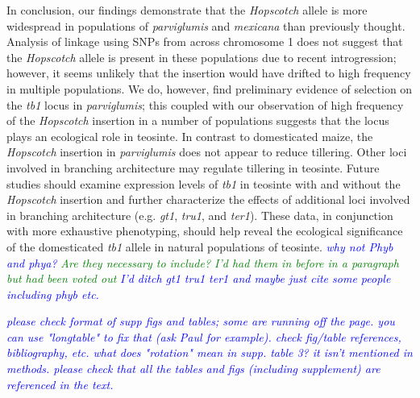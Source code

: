 \documentclass[11pt]{article}
\newcommand{\jri}[1]{\textcolor{blue}{ \emph{\scriptsize  #1}} }
\newcommand{\mbh}[1]{\textcolor{red}{ \emph{\scriptsize  #1}} }
\newcommand{\lev}[1]{\textcolor{green}{\emph{\scriptsize #1}} }
\begin{document}
\begin{linenumbers}
\begin{flushleft}
In conclusion, our findings demonstrate that the \emph{Hopscotch} allele is more widespread in populations of \emph{parviglumis} and \emph{mexicana} than previously thought. Analysis of linkage using SNPs from across chromosome 1 does not suggest that the \emph{Hopscotch} allele is present in these populations due to recent introgression; however, it seems unlikely that the insertion would have drifted to high frequency in multiple populations. We do, however, find preliminary evidence of selection on the \emph{tb1} locus in \emph{parviglumis}; this coupled with our observation of high frequency of the \emph{Hopscotch} insertion in a number of populations suggests that the locus plays an ecological role in teosinte. In contrast to domesticated maize, the \emph{Hopscotch} insertion in \emph{parviglumis} does not appear to reduce tillering. Other loci involved in branching architecture may regulate tillering in teosinte. Future studies should examine expression levels of \emph{tb1} in teosinte with and without the \emph{Hopscotch} insertion and further characterize the effects of additional loci involved in branching architecture (e.g. \emph{gt1}, \emph{tru1}, and \emph{ter1}).  These data, in conjunction with more exhaustive phenotyping, should help reveal the ecological significance of the domesticated \emph{tb1} allele in natural populations of teosinte. \jri{why not Phyb and phya? } \lev{Are they necessary to include? I'd had them in before in a paragraph but had been voted out} \jri{I'd ditch gt1 tru1 ter1 and maybe just cite some people including phyb etc.}

\jri{please check format of supp figs and tables; some are running off the page.  you can use "longtable" to fix that (ask Paul for example). check fig/table references, bibliography, etc. what does "rotation" mean in supp. table 3? it isn't mentioned in methods. please check that all the tables and figs (including supplement) are referenced in the text.}




\end{flushleft}
\end{linenumbers}
\end{document}
